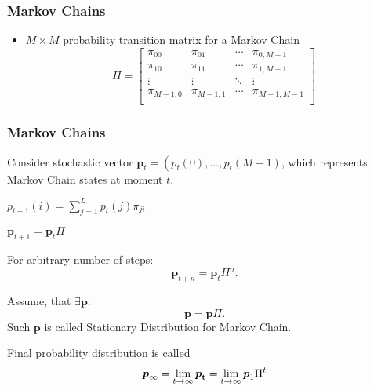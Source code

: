 \documentclass[14pt]{beamer}
\renewcommand{\vec}[1]{\ensuremath{\boldsymbol{#1}}}
\begin{document}
\begin{frame}
\frametitle{Markov Chains}
\begin{itemize}

    \item $M\times M$ probability transition matrix for a Markov Chain
    \[
    \Pi= \left[
      \begin{array}{cccc}
        \pi _{00} & \pi _{01} & \cdots & \pi _{0,M-1} \\
        \pi _{10} & \pi _{11} & \cdots & \pi _{1,M-1} \\
        \vdots    & \vdots  & \ddots & \vdots \\
        \pi _{M-1,0} & \pi _{M-1,1} & \cdots & \pi _{M-1,M-1} \\
      \end{array}
    \right]
    \]
    
\end{itemize}
\end{frame}



\begin{frame}
\frametitle{Markov Chains}
\begin{itemize}
\small{

    \item Consider stochastic vector $\vec p_t = \left( {p_t (0),...,p_t (M - 1)}$, which represents Markov Chain states at moment $t$.

    \item
    $p_{t + 1} (i) = \sum\limits_{j = 1}^L {p_t (j)\pi _{ji} }$
    
    \item $\vec p_{t + 1} = \vec p_t \Pi$
    
    \item For arbitrary number of steps:
    \[
    \vec p_{t + n} = \vec p_t \Pi ^n.
    \]
    
    \item Assume, that $\exists \vec p$:
    \begin{equation}
    \label{eq14} \vec p =\vec p\Pi .
    \end{equation}
    Such $ \vec p$ is called Stationary Distribution for Markov Chain.
    
    \item Final probability distribution is called 
    \begin{equation}
    \label{eq15} \vec p_\infty = \mathop {\lim }\limits_{t \to \infty} \vec p_{\rm {\bf t}} = \mathop {\lim }\limits_{t \to \infty } \vec p_1 \Pi ^t
    \end{equation}
}      
\end{itemize}
\end{frame}
\end{document}
